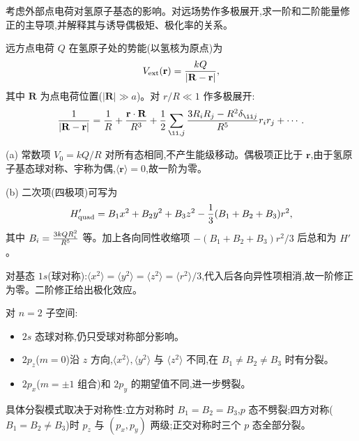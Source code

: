 \begin{question}
考虑外部点电荷对氢原子基态的影响。对远场势作多极展开,求一阶和二阶能量修正的主导项,并解释其与诱导偶极矩、极化率的关系。
\end{question}
\begin{solution}
远方点电荷 $Q$ 在氢原子处的势能(以氢核为原点)为
\[
V_{\rm ext}(\mathbf r) = {kQ\over|\mathbf R-\mathbf r|},
\]
其中 $\mathbf R$ 为点电荷位置($|\mathbf R|\gg a$)。对 $r/R\ll1$ 作多极展开:
\[
{1\over|\mathbf R-\mathbf r|} = {1\over R} + {\mathbf r\cdot\mathbf R\over R^3} + {1\over2}\sum_{\ii,j}{3R_iR_j-R^2\delta_{\ii j}\over R^5}r_ir_j + \cdots.
\]

(a) 常数项 $V_0=kQ/R$ 对所有态相同,不产生能级移动。偶极项正比于 $\mathbf r$,由于氢原子基态球对称、宇称为偶,$\langle\mathbf r\rangle=0$,故一阶为零。

(b) 二次项(四极项)可写为
\[
H'_{\rm quad} = B_1x^2+B_2y^2+B_3z^2 - {1\over3}(B_1+B_2+B_3)r^2,
\]
其中 $B_i = {3kQ R_i^2\over R^5}$ 等。加上各向同性收缩项 $-(B_1+B_2+B_3)r^2/3$ 后总和为 $H'$。

对基态 $1s$(球对称):$\langle x^2\rangle=\langle y^2\rangle=\langle z^2\rangle = \langle r^2\rangle/3$,代入后各向异性项相消,故一阶修正为零。二阶修正给出极化效应。

对 $n=2$ 子空间:
\begin{itemize}
\item $2s$ 态球对称,仍只受球对称部分影响。
\item $2p_z$($m=0$)沿 $z$ 方向,$\langle x^2\rangle,\langle y^2\rangle$ 与 $\langle z^2\rangle$ 不同,在 $B_1\neq B_2\neq B_3$ 时有分裂。
\item $2p_x$($m=\pm1$ 组合)和 $2p_y$ 的期望值不同,进一步劈裂。
\end{itemize}
具体分裂模式取决于对称性:立方对称时 $B_1=B_2=B_3$,$p$ 态不劈裂;四方对称($B_1=B_2\neq B_3$)时 $p_z$ 与 $(p_x,p_y)$ 两级;正交对称时三个 $p$ 态全部分裂。
\end{solution}


